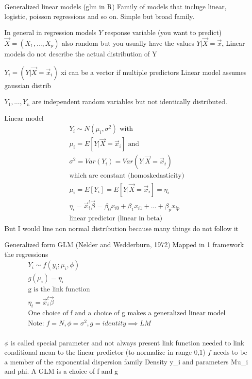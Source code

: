 Generalized linear models (glm in R)
Family of models that incluge linear, logistic, poisson regressions and so on. Simple but broad family. 

In general in regression models
$Y$ response variable (you want to predict)
$\vec{X}=(X_1, \dots, X_p)$ also random but you usually have the values
$Y|\vec{X}=\vec{x}$, Linear models do not describe the actual distribution of Y 


$Y_i=(Y|\vec{X}=\vec{x}_i)$
xi can be a vector if multiple predictors
Linear model assumes gaussian distrib 

$Y_1, \dots, Y_n$ are independent random variables but not identically distributed.

Linear model
\begin{align*}
  Y_i \sim N(\mu_i, \sigma^2) \text{ with } \\
  \mu_i=E[Y|\vec{X} = \vec{x}_i] \text{ and } \\
  \sigma^2 = Var(Y_i) = Var(Y|\vec{X} = \vec{x}_i) \\
  \text{which are constant (homoskedasticity)} \\ 
  \mu_i = E[Y_i] = E[Y|\vec{X} = \vec{x}_i] = \eta_i \\
  \eta_i = \vec{x}_i^t\vec{\beta} = \beta_0x_{i0} + \beta_1x_{i1} + \dots + \beta_px_{ip} \\
  \text{linear predictor (linear in beta)}
\end{align*}
But I would line non normal distribution because many things do not follow it

Generalized form 
GLM (Nelder and Wedderburn, 1972) Mapped in 1 framework the regressions
\begin{align*}
  Y_i \sim f(y_i; \mu_i, \phi) \\
  g(\mu_i) = \eta_i \\
  \text{g is the link function} \\
  \eta_i = \vec{x}_i^t\vec{\beta} \\
  \text{One choice of f and a choice of g makes a generalized linear model} \\
  \text{Note: } f = N, \phi = \sigma^2, g = identity \implies LM \\
\end{align*}

$\phi$ is called special parameter and not always present
link function needed to link conditional mean to the linear predictor (to normalize in range 0,1)
$f$ needs to be a member of the exponential dispersion family 
Density y_i and parameters Mu_i and phi.
A GLM is a choice of f and g

